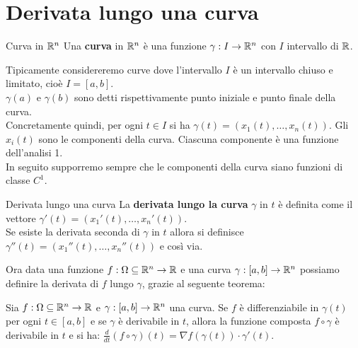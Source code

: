 \section{Derivata lungo una curva}\label{sec:derivata-lungo-una-curva}

\begin{definizione}{Curva in $\mathbb{R}^n$}
Una \textbf{curva} in $\mathbb{R}^n$ è una funzione $\gamma: I \rightarrow \mathbb{R}^n$ con $I$ intervallo di $\mathbb{R}$.
\end{definizione}

Tipicamente considereremo curve dove l'intervallo $I$ è un intervallo chiuso e limitato, cioè $I=[a,b]$.\\
$\gamma(a)$ e $\gamma(b)$ sono detti rispettivamente punto iniziale e punto finale della curva.\\
Concretamente quindi, per ogni $t\in I$ si ha $\gamma(t)=(x_1(t), \dots, x_n(t))$. Gli $x_i(t)$ sono le componenti della curva. Ciascuna componente è una funzione dell'analisi 1.\\
In seguito supporremo sempre che le componenti della curva siano funzioni di classe $C^1$.

\begin{definizione}{Derivata lungo una curva}
  La \textbf{derivata lungo la curva} $\gamma$ in $t$ è definita come il vettore $\gamma'(t)=(x_1'(t), \dots, x_n'(t))$.\\
  Se esiste la derivata seconda di $\gamma$ in $t$ allora si definisce $\gamma''(t)=(x_1''(t), \dots, x_n''(t))$ e così via.
\end{definizione}
Ora data una funzione $f:\Omega \subseteq \mathbb{R}^n \rightarrow \mathbb{R}$ e una curva $\gamma: [a,b] \rightarrow \mathbb{R}^n$ possiamo definire la derivata di $f$ lungo $\gamma$, grazie al seguente teorema:

\begin{teorema}{}
  Sia $f:\Omega \subseteq \mathbb{R}^n \rightarrow \mathbb{R}$ e $\gamma: [a,b] \rightarrow \mathbb{R}^n$ una curva. Se $f$ è differenziabile in $\gamma(t)$ per ogni $t \in [a,b]$ e se $\gamma$ è derivabile in $t$, allora la funzione composta $f \circ \gamma$ è derivabile in $t$ e si ha:
  $\frac{d}{dt}(f \circ \gamma)(t) = \nabla f(\gamma(t)) \cdot \gamma'(t)$.
\end{teorema}


